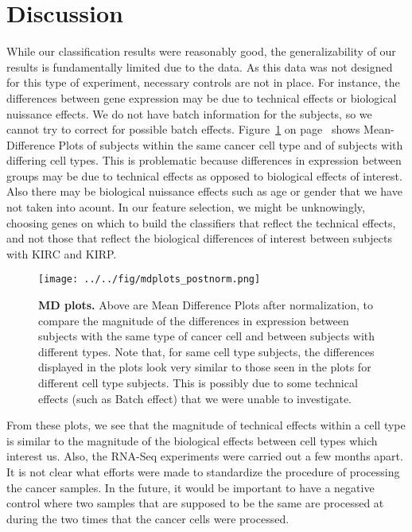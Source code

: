 \section{Discussion}
While our classification results were reasonably good, the generalizability of our results is fundamentally limited due to the data. As this data was not
designed for this type of experiment, necessary controls are not in place. For
instance, the differences between gene expression may be due to technical
effects or biological nuissance effects. We do not have batch information for the subjects, so we cannot try to
correct for possible batch effects. Figure~\ref{fig:mdplot} on
page~\pageref{fig:mdplot} shows Mean-Difference Plots of subjects within the
same cancer cell type and of subjects with differing cell types.  This is
problematic because differences in expression between groups may be due to
technical effects as opposed to biological effects of interest.  Also there may be biological nuissance effects such as age or gender that we have not taken into acount. In our feature
selection, we might be unknowingly, choosing genes on which to build the
classifiers that reflect the technical effects, and not those that reflect
the biological differences of interest between subjects with KIRC and KIRP.

\begin{figure}[H]
  \centering
    \texttt{[image: ../../fig/mdplots\_postnorm.png]}
\caption{\textbf{MD plots.} Above are Mean Difference Plots after normalization, to
  compare the magnitude of the differences in expression between subjects with
  the same type of cancer cell and between subjects with different types.  Note
  that, for same cell type subjects, the differences displayed in the plots look
  very similar to those seen in the plots for different cell type subjects. This
  is possibly due to some technical effects (such as Batch
  effect) that we were unable to investigate.}
   \label{fig:mdplot}
\end{figure}


From these plots, we see that the magnitude of technical effects within a cell
type is similar to the magnitude of the biological effects between cell types
which interest us. Also, the RNA-Seq experiments were carried out a few months
apart. It is not clear what efforts were made to standardize the procedure of
processing the cancer samples. In the future, it would be important to have a
negative control where two samples that are supposed to be the same are
processed at during the two times that the cancer cells were processed. 

